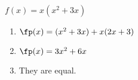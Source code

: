 {$f(x) = x(x^2+3x)$
}
{\begin{enumerate}
\item		$\fp(x) = (x^2+3x) + x(2x+3)$
\item		$\fp(x) = 3x^2 + 6x$
\item		They are equal.
\end{enumerate}
}
